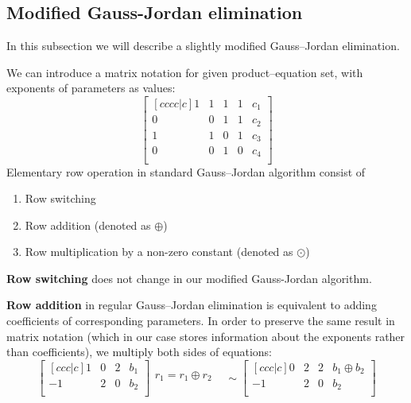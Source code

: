 \subsection{Modified Gauss-Jordan elimination}
In this subsection we will describe a slightly modified Gauss--Jordan elimination.

We can introduce a matrix notation for given product--equation set, with exponents of parameters as values:
\begin{equation}
\begin{bmatrix}[cccc|c]
    1 & 1 & 1 & 1 & c_1\\
    0 & 0 & 1 & 1 & c_2\\
    1 & 1 & 0 & 1 & c_3\\
    0 & 0 & 1 & 0 & c_4\\
\end{bmatrix}
\end{equation}
Elementary row operation in standard Gauss--Jordan algorithm consist of 
\begin{enumerate}
    \item Row switching
    \item Row addition (denoted as $\oplus$)
    \item Row multiplication by a non-zero constant (denoted as $\odot$)
\end{enumerate}
\textbf{Row switching} does not change in our modified Gauss-Jordan algorithm.

\textbf{Row addition} in regular Gauss--Jordan elimination is equivalent to adding coefficients of corresponding parameters.
In order to preserve the same result in matrix notation (which in our case stores information about the exponents rather than coefficients), we multiply both sides of equations:
\begin{equation}
    \begin{bmatrix}[ccc|c]
        1 & 0 & 2 & b_1 \\
        -1 & 2 & 0 & b_2 \\
    \end{bmatrix}
    \begin{matrix}
        r_1 = r_1 \oplus r_2 \\
        &
    \end{matrix}
    \sim
    \begin{bmatrix}[ccc|c]
        0 & 2 & 2 & b_1 \oplus b_2 \\
        -1 & 2 & 0 & b_2 \\
    \end{bmatrix}
\end{equation}


